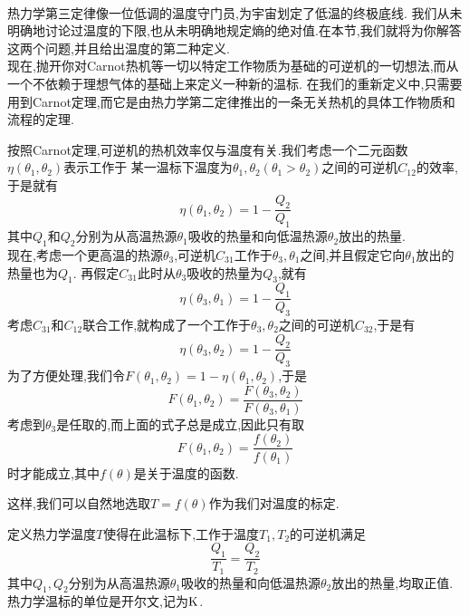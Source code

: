 \documentclass{ctexart}
\begin{document}
\pagestyle{plain}
\noindent{}\vspace{15pt}\\
\indent 热力学第三定律像一位低调的温度守门员,为宇宙划定了低温的终极底线.%
我们从未明确地讨论过温度的下限,也从未明确地规定熵的绝对值.在本节,我们就将为你解答这两个问题,并且给出温度的第二种定义.\vspace{12pt}\\
\indent 现在,抛开你对Carnot热机等一切以特定工作物质为基础的可逆机的一切想法,而从一个不依赖于理想气体的基础上来定义一种新的温标.%
在我们的重新定义中,只需要用到Carnot定理,而它是由热力学第二定律推出的一条无关热机的具体工作物质和流程的定理.
\begin{derivation}
    按照Carnot定理,可逆机的热机效率仅与温度有关.我们考虑一个二元函数$\eta\left(\theta_1,\theta_2\right)$表示工作于%
    某一温标下温度为$\theta_1,\theta_2\left(\theta_1>\theta_2\right)$之间的可逆机$C_{12}$的效率,于是就有
    \[\eta\left(\theta_1,\theta_2\right)=1-\dfrac{Q_2}{Q_1}\]
    其中$Q_1$和$Q_2$分别为从高温热源$\theta_1$吸收的热量\footnotemark 和向低温热源$\theta_2$放出的热量.\\
    现在,考虑一个更高温的热源$\theta_3$,可逆机$C_{31}$工作于$\theta_3,\theta_1$之间,并且假定它向$\theta_1$放出的热量也为$Q_1$.%
    再假定$C_{31}$此时从$\theta_3$吸收的热量为$Q_3$,就有
    \[\eta\left(\theta_3,\theta_1\right)=1-\dfrac{Q_1}{Q_3}\]
    考虑$C_{31}$和$C_{12}$联合工作,就构成了一个工作于$\theta_3,\theta_2$之间的可逆机$C_{32}$,于是有
    \[\eta\left(\theta_3,\theta_2\right)=1-\dfrac{Q_2}{Q_3}\]
    为了方便处理,我们令$F\left(\theta_1,\theta_2\right)=1-\eta\left(\theta_1,\theta_2\right)$,于是
    \[F\left(\theta_1,\theta_2\right)=\dfrac{F\left(\theta_3,\theta_2\right)}{F\left(\theta_3,\theta_1\right)}\]
    考虑到$\theta_3$是任取的,而上面的式子总是成立,因此只有取
    \[F\left(\theta_1,\theta_2\right)=\dfrac{f\left(\theta_2\right)}{f\left(\theta_1\right)}\]
    时才能成立,其中$f(\theta)$是关于温度的函数.
\end{derivation}
这样,我们可以自然地选取$T=f(\theta)$作为我们对温度的标定.
\begin{definition}[3D.1.1 热力学温标]
    定义热力学温度$T$使得在此温标下,工作于温度$T_1,T_2$的可逆机满足
    \[\dfrac{Q_1}{T_1}=\dfrac{Q_2}{T_2}\]
    其中$Q_1,Q_2$分别为从高温热源$\theta_1$吸收的热量和向低温热源$\theta_2$放出的热量,均取正值.\\
    热力学温标的单位是开尔文,记为$\text K$.
\end{definition}
\end{document}

